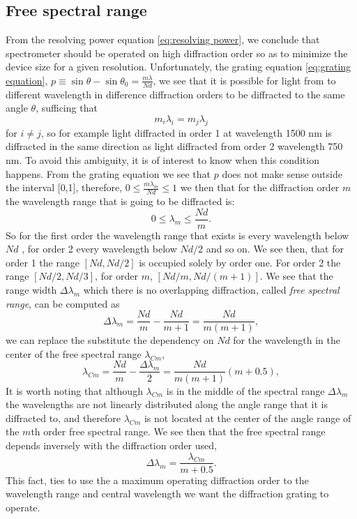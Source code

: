 \documentclass[12pt,twoside,english]{book}
\renewcommand{\~}{\perispomeni}%
\numberwithin{equation}{section}
\numberwithin{figure}{section}
\begin{document}
\subsection{Free spectral range}

From the resolving power equation \ref{eq:resolving power}, we conclude that spectrometer should be operated on high diffraction order so as to minimize the device size for a given resolution. Unfortunately, the grating equation \ref{eq:grating equation}, $p\equiv\sin\theta-\sin\theta_{0}=\frac{m\lambda}{Nd}$, we see that it is possible for light from to different wavelength in difference diffraction orders to be diffracted to the same angle $\theta$, sufficing that 
\begin{equation}
m_{i}\lambda_{i}=m_{j}\lambda_{j}
\end{equation}
for $i\neq j$, so for example light diffracted in order 1 at wavelength 1500 nm is diffracted in the same direction as light diffracted from order 2 wavelength 750 nm. To avoid this ambiguity, it is of interest to know when this condition happens. From the grating equation we see that $p$ does not make sense outside the interval {[}0,1{]}, therefore, $0\le\frac{m\lambda_{m}}{Nd}\le1$ we then that for the diffraction order $m$ the wavelength range that is going to be diffracted is:
\begin{equation}
0\le\lambda_{m}\le\frac{Nd}{m}.
\end{equation}
So for the first order the wavelength range that exists is every wavelength below $Nd$ , for order 2 every wavelength below $Nd/2$ and so on. We see then, that for order 1 the range $[Nd,Nd/2]$ is occupied solely by order one. For order 2 the range $[Nd/2,Nd/3]$, for order $m$, $[Nd/m,Nd/(m+1)]$. We see that the range width $\Delta\lambda_{m}$
which there is no overlapping diffraction, called \emph{free spectral range}, can be computed as
\begin{equation} 
\Delta\lambda_{m}=\frac{Nd}{m}-\frac{Nd}{m+1}=\frac{Nd}{m(m+1)},
\end{equation}
we can replace the substitute the dependency on $Nd$ for the wavelength in the center of the free spectral range $\lambda_{Cm}$,
\begin{equation}
\lambda_{Cm}=\frac{Nd}{m}-\frac{\Delta\lambda_{m}}{2}=\frac{Nd}{m(m+1)}(m+0.5),
\end{equation}
It is worth noting that although $\lambda_{Cm}$ is in the middle of the spectral range $\Delta\lambda_{m}$ the wavelengths are not linearly distributed along the angle range that it is diffracted to, and therefore $\lambda_{Cm}$ is not located at the center of the angle range of the $m$th order free spectral range. We see then that the free spectral range depends inversely with the diffraction order used,
\begin{equation}
\Delta\lambda_{m}=\frac{\lambda_{Cm}}{m+0.5}.
\label{eq:FSR}
\end{equation}
This fact, ties to use the a maximum operating diffraction order to the wavelength range and central wavelength we want the diffraction grating to operate.
\end{document}

